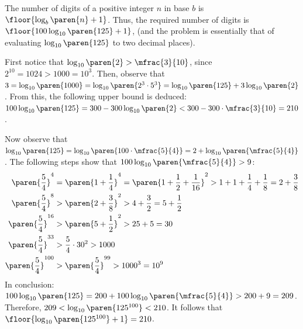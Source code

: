 The number of digits of a positive integer $n$ in base $b$ is
$\floor{\log_{b}\paren{n} + 1}$.
Thus, the required number of digits is $\floor{100 \log_{10}\paren{125} + 1}$,
(and the problem is essentially that of evaluating
$\log_{10}\paren{125}$ to two decimal places).

First notice that $\log_{10}\paren{2} > \mfrac{3}{10}$,
since $2^{10} = 1024 > 1000 = 10^3$.
Then, observe that
$3 = \log_{10}\paren{1000}
   = \log_{10}\paren{2^3 \cdot 5^3}
   = \log_{10}\paren{125} + 3 \log_{10}\paren{2}$.
From this, the following upper bound is deduced:
$100 \log_{10}\paren{125}
 = 300 - 300 \log_{10}\paren{2}
 < 300 - 300 \cdot \mfrac{3}{10}
 = 210$.

Now observe that
$\log_{10}\paren{125}
 = \log_{10}\paren{100 \cdot \mfrac{5}{4}}
 = 2 + \log_{10}\paren{\mfrac{5}{4}}$.
The following steps show that $100 \log_{10}\paren{\mfrac{5}{4}} > 9$:
\begin{align*}
 \paren{\frac{5}{4}}^{4}   &= \paren{1 + \frac{1}{4}}^{4} = \paren{1 + \frac{1}{2} + \frac{1}{16} }^2
   > 1 + 1 + \frac{1}{4} + \frac{1}{8} = 2 + \frac{3}{8} \\
 \paren{\frac{5}{4}}^{8}   &> \paren{2 + \frac{3}{8}}^2
   > 4 + \frac{3}{2} = 5 + \frac{1}{2} \\
 \paren{\frac{5}{4}}^{16}  &> \paren{5 + \frac{1}{2}}^2 > 25 + 5 = 30 \\
 \paren{\frac{5}{4}}^{33}  &> \frac{5}{4} \cdot 30^2 > 1000 \\
 \paren{\frac{5}{4}}^{100} &> \paren{\frac{5}{4}}^{99} > 1000^3 = 10^9
\end{align*}
In conclusion:
$100 \log_{10}\paren{125}
 = 200 + 100 \log_{10}\paren{\mfrac{5}{4}}
 > 200 + 9 = 209$.\newline
Therefore, $209 < \log_{10}\paren{125^{100}} < 210$.
It follows that $\floor{\log_{10}\paren{125^{100}} + 1} = 210$.
